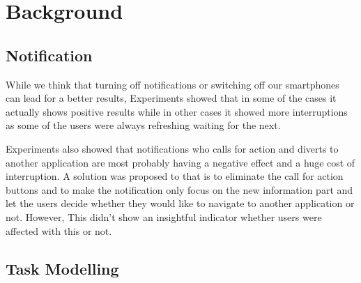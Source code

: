 \chapter{Background}
\label{chap:background}

\section{Notification} 
\label{sec:s2}
While we think that turning off notifications or switching off our smartphones can lead for a better results, Experiments showed that in some of the cases it actually shows positive results while in other cases it showed more interruptions as some of the users were always refreshing waiting for the next. \cite{citeKey3}

Experiments also showed that notifications who calls for action and diverts to another application are most probably having a negative effect and a huge cost of interruption. A solution was proposed to that is to eliminate the call for action buttons and to make the notification only focus on the new information part and let the users decide whether they would like to navigate to another application or not. However, This didn't show an insightful indicator whether users were affected with this or not.

%
%

\section{Task Modelling}

